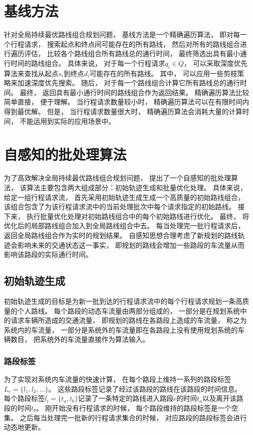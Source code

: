 \section{基线方法}
针对全局持续最优路线组合规划问题， 基线方法是一个精确遍历算法， 即对每一个行程请求， 搜索起点和终点间可能存在的所有路线， 然后对所有的路线组合进行遍历评估， 比较各个路线组合所有路线总的通行时间， 最终筛选出具有最小通行时间的路线组合。 具体来说， 对于每一个行程请求$q_i\in Q$， 可以采取深度优先算法来查找从起点$s_i$到终点$d_i$可能存在的所有路线。 其中， 可以应用一些剪枝策略来加速深度优先搜索。 随后， 对于每一个路线组合计算它所有路线总的通行时间。 最终， 返回具有最小通行时间的路线组合作为返回结果。
精确遍历算法比较简单直接， 便于理解。 当行程请求数量较小时， 精确遍历算法可以在有限时间内得到最优解。 但是， 当行程请求数量很大时， 精确遍历算法会消耗大量的计算时间， 不能运用到实际的应用场景中。



\section{自感知的批处理算法}


为了高效解决全局持续最优路线组合规划问题， 提出了一个自感知的批处理算法， 该算法主要包含两大组成部分：初始轨迹生成和批量优化处理。 具体来说， 给定一组行程请求流， 首先采用初始轨迹生成生成一个高质量的初始路线组合， 该组合包含了为该行程请求流中的当前处理批次中每个请求指定的初始路线。 接下来， 执行批量优化处理对初始路线组合中的每个初始路线进行优化。 最终， 将优化后的局部路线组合加入到全局路线组合中去。 每当处理完一批行程请求后， 返回全局路线组合作为实时的规划结果。 自感知思想合理考虑了新规划的路线轨迹会影响未来的交通状态这一事实， 即规划的路线会增加一些路段的车流量从而影响该路段的实际通行时间。
\subsection{初始轨迹生成}
初始轨迹生成的目标是为新一批到达的行程请求流中的每个行程请求规划一条高质量的个人路线。 每个路段的动态车流量由两部分组成的， 一部分是在规划系统中的请求车辆所造成的交通流量， 即规划的路线在各路段上造成的车流量， 称之为系统内的车流量， 一部分是系统外的车流量即在各路段上没有使用规划系统的车辆数目， 把系统外的车流量直接作为算法输入。
\subsubsection*{路段标签}

为了实现对系统内车流量的快速计算， 在每个路段上维持一系列的路段标签$L_e=\{l_1,l_2,\ldots\}$。 这些路段标签记录了经过该路段的路线在该路段的时间信息。 每个路段标签$l_i=\{t_a,t_b\}$记录了一条特定的路线进入路段$e$的时间$t_a$以及离开该路段的时间$t_b$。 刚开始没有行程请求的时候， 每个路段维持的路段标签是一个空集。 之后每当处理完一批新的行程请求集合的时候， 对应路段的路段标签会进行动态地更新。




